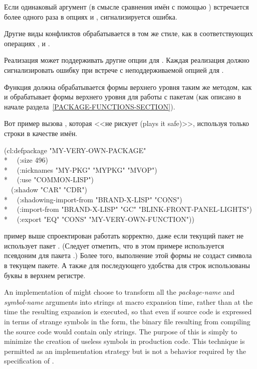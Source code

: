 \begin{defmac}
Если одинаковый аргумент  (в смысле сравнения имён с помощью
) встречается более одного раза в опциях  и
, сигнализируется ошибка.

Другие виды конфликтов обрабатывается в том же стиле, как в соответствующих
операциях ,  и .

Реализация может поддерживать другие опции для .
Каждая реализация должно сигнализировать ошибку при встрече с неподдерживаемой
опцией для .

Функция  должна обрабатывается формы верхнего уровня
 таким же методом, как и обрабатывает формы верхнего уровня для
работы с пакетам (как описано в начале раздела~\ref{PACKAGE-FUNCTIONS-SECTION}).

Вот пример вызова , которая <<не рискует (plays it safe)>>, используя только
строки в качестве имён.
\begin{lisp}
(cl:defpackage "MY-VERY-OWN-PACKAGE" \\*
~~(:size 496) \\*
~~(:nicknames "MY-PKG" "MYPKG" "MVOP") \\*
~~(:use "COMMON-LISP") \\
~~(:shadow "CAR" "CDR") \\*
~~(:shadowing-import-from "BRAND-X-LISP" "CONS") \\*
~~(:import-from "BRAND-X-LISP" "GC" "BLINK-FRONT-PANEL-LIGHTS") \\*
~~(:export "EQ" "CONS" "MY-VERY-OWN-FUNCTION"))
\end{lisp}
 пример выше спроектирован работать корректно, даже если текущий
пакет не использует пакет . (Следует отметить, что
в этом примере используется псевдоним  для пакета .)
Более того, выполнение этой формы  не создаст символа в текущем
пакете. А также для последующего удобства для строк использованы буквы в верхнем
регистре.

\beforenoterule
\begin{implementation}
An implementation of  might choose to transform
all the \emph{package-name} and \emph{symbol-name} arguments
into strings at macro expansion time, rather than at the time
the resulting expansion is executed, so that even if source code
is expressed in terms of strange symbols in the  form,
the binary file resulting from compiling the source code would
contain only strings.  The purpose of this is simply to minimize
the creation of useless symbols in production code.  This technique
is permitted as an implementation strategy but is not a
behavior required by the specification of .
\end{implementation}
\afternoterule


\end{defmac}
